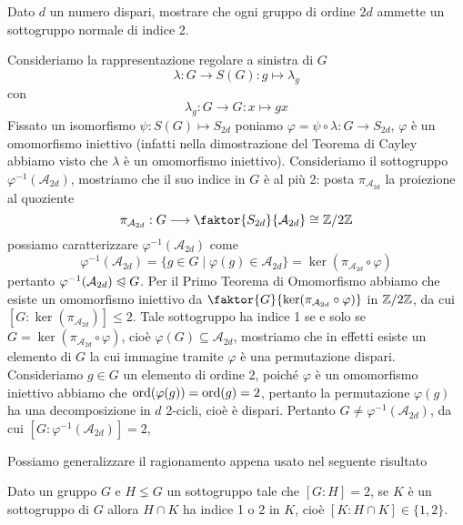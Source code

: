 \documentclass[11pt]{scrartcl}
\begin{document}
\begin{exercise}
    Dato $d$ un numero dispari, mostrare che ogni gruppo di ordine $2d$ ammette
    un sottogruppo normale di indice 2.
\end{exercise}

\begin{soln}
    Consideriamo la rappresentazione regolare a sinistra di $G$
    \[
        \lambda: G \longrightarrow S(G) : g\longmapsto \lambda_g
    \]
    con
    \[
        \lambda_g : G\longrightarrow G : x\longmapsto gx
    \]
    Fissato un isomorfismo $\psi: S(G) \longmapsto S_{2d}$ poniamo
    $\varphi = \psi\circ\lambda :G\longrightarrow S_{2d}$, $\varphi$ è 
    un omomorfismo iniettivo (infatti nella dimostrazione del Teorema di Cayley
    abbiamo visto che $\lambda$ è un omomorfismo iniettivo). Consideriamo 
    il sottogruppo $\varphi^{-1}(\mathcal{A}_{2d})$, mostriamo che il suo 
    indice in $G$ è al più 2:
    posta $\pi_{\mathcal{A}_{2d}}$ la proiezione al quoziente
    \[
        \pi_{\mathcal{A}_{2d}}:G\longrightarrow \faktor{S_{2d}}{\mathcal{A}_{2d}}\cong \Z2
    \]
    possiamo caratterizzare $\varphi^{-1}(\mathcal{A}_{2d})$ come
    \[
        \varphi^{-1}(\mathcal{A}_{2d}) = \{g \in G \mid \varphi(g) \in \mathcal{A}_{2d}\}
        = \ker (\pi_{\mathcal{A}_{2d}}\circ\varphi)
    \]
    pertanto $\varphi^{-1}(\mathcal{A}_{2d})\trianglelefteqslant G$. 
    Per il Primo Teorema di Omomorfismo abbiamo che esiste un omomorfismo
    iniettivo da $\faktor{G}{\ker(\pi_{\mathcal{A}_{2d}}\circ\varphi)}$ in
    $\mathbb{Z}/{2}\mathbb{Z}$, da cui $[G:\ker(\pi_{\mathcal{A}_{2d}})] \leqslant 2$. Tale 
    sottogruppo ha indice 1 se e solo se $G = \ker(\pi_{\mathcal{A}_{2d}}\circ\varphi)$,
    cioè $\varphi(G) \subseteq \mathcal{A}_{2d}$, mostriamo che in effetti esiste 
    un elemento di $G$ la cui immagine tramite $\varphi$ è una permutazione 
    dispari. Consideriamo $g \in G$ un elemento di ordine 2, poiché $\varphi$
    è un omomorfismo iniettivo abbiamo che $\operatorname{ord}(\varphi(g)) = \operatorname{ord}(g) = 2$,
    pertanto la permutazione $\varphi(g)$ ha una decomposizione in $d$ 2-cicli,
    cioè è dispari. Pertanto $G \neq \varphi^{-1}(\mathcal{A}_{2d})$,
    da cui $[G: \varphi^{-1}(\mathcal{A}_{2d})] = 2$,
\end{soln}

Possiamo generalizzare il ragionamento appena usato nel seguente risultato

\begin{proposition}
    \label{prop2.0}
    Dato un gruppo $G$ e $H\lneq G$ un sottogruppo tale che $[G:H] = 2$, se
    $K$ è un sottogruppo di $G$ allora $H\cap K$ ha indice 1 o 2 in $K$,
    cioè $[K:H\cap K] \in \{1, 2\}$.
\end{proposition}
\end{document}

